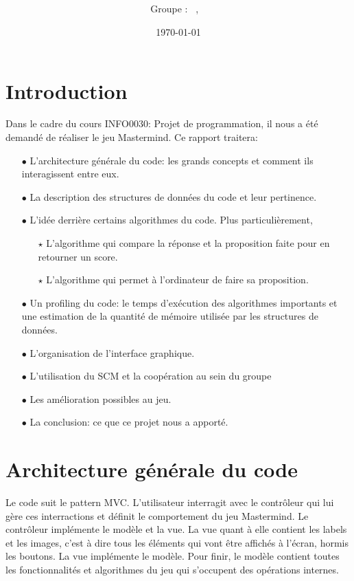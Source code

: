 \documentclass[a4paper, 11pt, oneside]{article}
\title{\facultee \\ \annee \\ \intitule}
\author{Groupe \GrNbr : \PrenomUN~\textsc{\NomUN}, \PrenomDEUX~\textsc{\NomDEUX}}
\date{\today}
\newcommand{\tablemat}{~}
\renewcommand{\tablemat}{\tableofcontents}
\begin{document}
\maketitle
\newpage
\tablemat
\newpage

\section{Introduction}
Dans le cadre du cours INFO0030: Projet de programmation, il nous a été demandé de réaliser le jeu Mastermind.
Ce rapport traitera:
\begin{itemize}
	\item[$\bullet$] L'architecture générale du code: les grands concepts et comment ils interagissent entre eux.
	\item[$\bullet$] La description des structures de données du code et leur pertinence.
	\item[$\bullet$] L'idée derrière certains algorithmes du code. Plus particulièrement,
	\begin{itemize}
	    \item[$\star$] L'algorithme qui compare la réponse et la proposition faite pour en retourner un score.
	    \item[$\star$] L'algorithme qui permet à l'ordinateur de faire sa proposition. 
	\end{itemize}
	\item[$\bullet$] Un profiling du code: le temps d'exécution des algorithmes importants et une estimation de la quantité de mémoire utilisée par les structures de données.
	\item[$\bullet$] L'organisation de l'interface graphique.
	\item[$\bullet$] L'utilisation du SCM et la coopération au sein du groupe
	\item[$\bullet$] Les amélioration possibles au jeu.
	\item[$\bullet$] La conclusion: ce que ce projet nous a apporté.
\end{itemize} 
\section{Architecture générale du code}
Le code suit le pattern MVC.
L'utilisateur interragit avec le contrôleur qui lui gère ces interractions et définit le comportement du jeu Mastermind. Le contrôleur implémente le modèle et la vue.
La vue quant à elle contient les labels et les images, c'est à dire tous les éléments qui vont être affichés à l'écran, hormis les boutons. La vue implémente le modèle.
Pour finir, le modèle contient toutes les fonctionnalités et algorithmes du jeu qui s'occupent des opérations internes.
\end{document}
